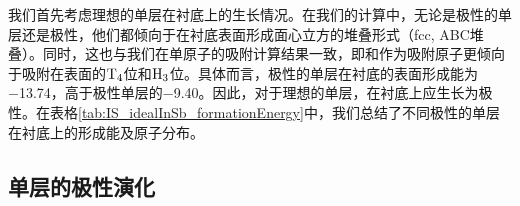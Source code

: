 我们首先考虑理想的单层在衬底上的生长情况。在我们的计算中，无论是极性的单层还是极性，他们都倾向于在衬底表面形成面心立方的堆叠形式（fcc, ABC堆叠）。同时，这也与我们在单原子的吸附计算结果一致，即和作为吸附原子更倾向于吸附在表面的$\rm T_{4} \it$位和$\rm H_{3} \it$位。具体而言，极性的单层在衬底的表面形成能为\SI{-13.74}{\mievpas}，高于极性单层的\SI{-9.40}{\mievpas}。因此，对于理想的单层，在衬底上应生长为极性。在表格\ref{tab:IS_idealInSb_formationEnergy}中，我们总结了不同极性的单层在衬底上的形成能及原子分布。

\subsection{单层的极性演化}

